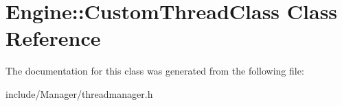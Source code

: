 \hypertarget{classEngine_1_1CustomThreadClass}{}\section{Engine\+:\+:Custom\+Thread\+Class Class Reference}
\label{classEngine_1_1CustomThreadClass}


The documentation for this class was generated from the following file\+:\begin{DoxyCompactItemize}
\item 
include/\+Manager/threadmanager.\+h\end{DoxyCompactItemize}
